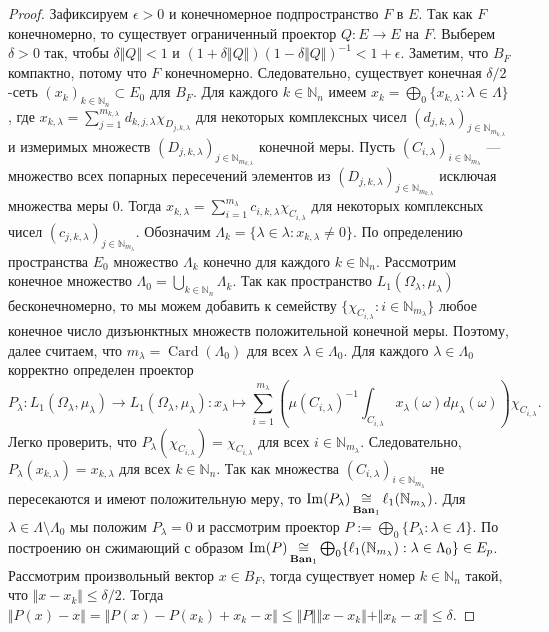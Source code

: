 \begin{proof}
Зафиксируем $\epsilon>0$ и конечномерное подпространство $F$ в $E$. Так как $F$
конечномерно, то существует ограниченный проектор $Q:E\to E$ на $F$. Выберем
$\delta>0$ так, чтобы $\delta\Vert Q\Vert<1$ и $(1+\delta\Vert
Q\Vert){(1-\delta\Vert Q\Vert)}^{-1}<1+\epsilon$. Заметим, что $B_F$ компактно,
потому что $F$ конечномерно. Следовательно, существует конечная $\delta/2$-сеть
${(x_k)}_{k\in\mathbb{N}_n}\subset E_0$ для $B_F$. Для каждого $k\in\mathbb{N}_n$
имеем $x_k=\bigoplus_0 \{x_{k,\lambda}:\lambda\in\Lambda \}$, где
$x_{k,\lambda}=\sum_{j=1}^{m_{k,\lambda}}d_{k,j,\lambda}\chi_{D_{j,k,\lambda}}$
для некоторых комплексных чисел
${(d_{j,k,\lambda})}_{j\in\mathbb{N}_{m_{k,\lambda}}}$ и измеримых множеств
${(D_{j,k,\lambda})}_{j\in\mathbb{N}_{m_{k,\lambda}}}$ конечной меры. Пусть
${(C_{i,\lambda})}_{i\in\mathbb{N}_{m_\lambda}}$ --- множество всех попарных
пересечений элементов из ${(D_{j,k,\lambda})}_{j\in\mathbb{N}_{m_{k,\lambda}}}$
исключая множества меры $0$. Тогда $x_{k,\lambda}=\sum_{i=1}^{m_\lambda}
c_{i,k,\lambda}\chi_{C_{i,\lambda}}$ для некоторых комплексных чисел
${(c_{j,k,\lambda})}_{j\in\mathbb{N}_{m_{\lambda}}}$. Обозначим $\Lambda_k=
\{\lambda\in\lambda:x_{k,\lambda}\neq 0 \}$. По определению пространства $E_0$
множество $\Lambda_k$ конечно для каждого $k\in\mathbb{N}_n$. Рассмотрим
конечное множество $\Lambda_0=\bigcup_{k\in\mathbb{N}_n}\Lambda_k$. Так как
пространство $L_1(\Omega_\lambda, \mu_\lambda)$ бесконечномерно, то мы можем
добавить к семейству $ \{\chi_{C_{i,\lambda}}:i\in\mathbb{N}_{m_\lambda} \}$
любое конечное число дизъюнктных множеств положительной конечной меры. Поэтому,
далее считаем, что $m_\lambda=\operatorname{Card}(\Lambda_0)$ для всех
$\lambda\in\Lambda_0$. Для каждого $\lambda\in\Lambda_0$ корректно определен
проектор 
$$
P_\lambda
:L_1(\Omega_\lambda,\mu_\lambda)\to L_1(\Omega_\lambda,\mu_\lambda)
:x_\lambda\mapsto \sum_{i=1}^{m_\lambda}\left( 
    {\mu(C_{i,\lambda})}^{-1}
    \int_{C_{i,\lambda}}x_\lambda(\omega)d\mu_\lambda(\omega)
\right)\chi_{C_{i,\lambda}}.
$$
Легко проверить, что $P_\lambda(\chi_{C_{i,\lambda}})=\chi_{C_{i,\lambda}}$ для
всех $i\in\mathbb{N}_{m_\lambda}$. Следовательно,
$P_\lambda(x_{k,\lambda})=x_{k,\lambda}$ для всех $k\in\mathbb{N}_n$. Так как
множества ${(C_{i,\lambda})}_{i\in\mathbb{N}_{m_\lambda}}$ не пересекаются и имеют
положительную меру, то
$\operatorname{Im}(P_\lambda)\mathop{\mathbin{\cong}}\limits_{\mathbf{Ban}_1}\ell_1(\mathbb{N}_{m_\lambda})$.
Для $\lambda\in\Lambda\setminus\Lambda_0$ мы положим $P_\lambda=0$ и рассмотрим
проектор $P:=\bigoplus_0 \{P_\lambda:\lambda\in\Lambda \}$. По построению он
сжимающий с образом $\operatorname{Im}(P)\mathop{\mathbin{\cong}}\limits_{\mathbf{Ban}_1}\bigoplus_0
\{\ell_1(\mathbb{N}_{m_\lambda}):\lambda\in\Lambda_0 \}\in E_{p}$. Рассмотрим
произвольный вектор $x\in B_F$, тогда существует номер $k\in\mathbb{N}_n$ такой,
что $\Vert x-x_k\Vert\leq \delta/2$. Тогда $\Vert P(x)-x\Vert=\Vert
P(x)-P(x_k)+x_k-x\Vert\leq\Vert P\Vert\Vert x-x_k\Vert+\Vert
x_k-x\Vert\leq\delta$.


\end{proof}
